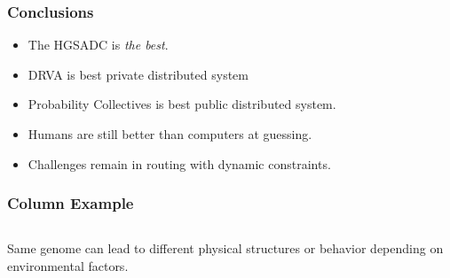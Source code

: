 \documentclass{beamer}
\begin{document}
\begin{frame}
\frametitle{Conclusions}
	\begin{itemize}
		\item The HGSADC is \textit{the best}.	
		\item DRVA is best private distributed system		
		\item Probability Collectives is best public distributed system.
		\item Humans are still better than computers at guessing.
		\item Challenges remain in  routing with dynamic constraints.
	\end{itemize}
\end{frame}

\begin{frame}
  \frametitle{Column Example}
  \begin{columns}
  \begin{column}{.65\textwidth}
Same genome can lead to different physical structures or behavior depending on environmental factors.
  \end{column}
  \end{columns}
\end{frame}
\end{document}
